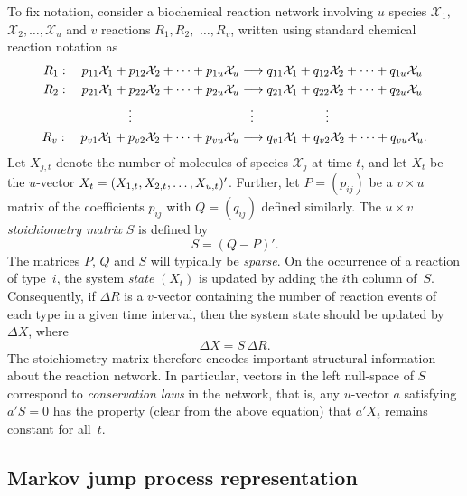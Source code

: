 \documentclass[12pt, DIV12]{scrartcl}
\begin{document}
To fix notation, consider a biochemical reaction network involving $u$ species
$\mathcal{X}_1,$\linebreak[4] $\mathcal{X}_2,\ldots,\mathcal{X}_u$ and $v$ reactions
$R_1,R_2,$ $\ldots,R_v$, written using standard chemical reaction notation as
\begin{align*}
R_1:\quad p_{11}\mathcal{X}_1+p_{12}\mathcal{X}_2+\cdots+p_{1u}\mathcal{X}_u 
&\longrightarrow  q_{11}\mathcal{X}_1+q_{12}\mathcal{X}_2+\cdots+q_{1u}\mathcal{X}_u \\
R_2:\quad p_{21}\mathcal{X}_1+p_{22}\mathcal{X}_2+\cdots+p_{2u}\mathcal{X}_u 
&\longrightarrow q_{21}\mathcal{X}_1+q_{22}\mathcal{X}_2+\cdots+q_{2u}\mathcal{X}_u \\
\vdots \hspace{3cm}& \hspace{0.3cm} \vdots \hspace{2cm} \vdots \\
R_v:\quad p_{v1}\mathcal{X}_1+p_{v2}\mathcal{X}_2+\cdots+p_{vu}\mathcal{X}_u 
&\longrightarrow q_{v1}\mathcal{X}_1+q_{v2}\mathcal{X}_2+\cdots+q_{vu}\mathcal{X}_u.
\end{align*}
Let $X_{j,t}$ denote the number of molecules of species $\mathcal{X}_j$ at time
$t$, and let $X_t$ be the $u$-vector $X_t =
(X_{1,t},X_{2,t},\ldots,\linebreak[0] X_{u,t})'$. Further, let $P=(p_{ij})$ be a
$v\times u$ matrix of the coefficients $p_{ij}$ with $Q=(q_{ij})$ defined
similarly. The $u\times v$ \emph{stoichiometry matrix} $S$ is defined by
\[
S = (Q-P)'.
\]
The matrices $P$, $Q$ and $S$ will typically be \emph{sparse}. On the occurrence
of a reaction of type~$i$, the system \emph{state} $(X_t)$ is updated by adding
the $i$th column of~$S$. Consequently, if $\Delta R$ is a $v$-vector containing
the number of reaction events of each type in a given time interval, then the
system state should be updated by $\Delta X$, where
\[
\Delta X = S\, \Delta R.
\]
The stoichiometry matrix therefore encodes important structural information
about the reaction network. In particular, vectors in the left null-space of $S$
correspond to \emph{conservation laws} in the network, that is, any $u$-vector
$a$ satisfying $a'S=0$ has the property (clear from the above equation) that
$a'X_t$ remains constant for all~$t$.

\subsection{Markov jump process representation}
\end{document}
